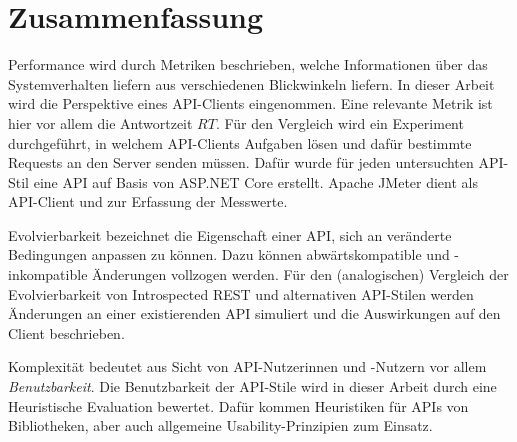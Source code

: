 \section{Zusammenfassung}

Performance wird durch Metriken beschrieben, welche Informationen über das Systemverhalten liefern aus verschiedenen Blickwinkeln liefern. In dieser Arbeit wird die Perspektive eines API-Clients eingenommen. Eine relevante Metrik ist hier vor allem die Antwortzeit \(RT\). Für den Vergleich wird ein Experiment durchgeführt, in welchem API-Clients Aufgaben lösen und dafür bestimmte Requests an den Server senden müssen. Dafür wurde für jeden untersuchten API-Stil eine API auf Basis von ASP.NET Core erstellt. Apache JMeter dient als API-Client und zur Erfassung der Messwerte.

Evolvierbarkeit bezeichnet die Eigenschaft einer API, sich an veränderte Bedingungen anpassen zu können. Dazu können abwärtskompatible und -inkompatible Änderungen vollzogen werden. Für den (analogischen) Vergleich der Evolvierbarkeit von Introspected REST und alternativen API-Stilen werden Änderungen an einer existierenden API simuliert und die Auswirkungen auf den Client beschrieben.

Komplexität bedeutet aus Sicht von API-Nutzerinnen und -Nutzern vor allem \emph{Benutzbarkeit}. Die Benutzbarkeit der API-Stile wird in dieser Arbeit durch eine Heuristische Evaluation bewertet. Dafür kommen Heuristiken für APIs von Bibliotheken, aber auch allgemeine Usability-Prinzipien zum Einsatz.